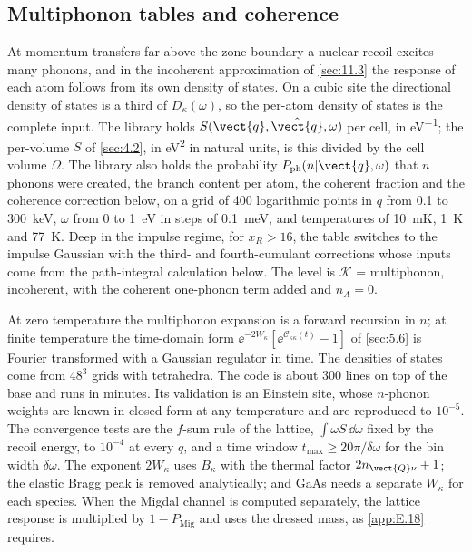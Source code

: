\subsection{Multiphonon tables and coherence}

At momentum transfers far above the zone boundary a nuclear recoil excites many phonons, and in the incoherent approximation of \cref{sec:11.3} the response of each atom follows from its own density of states. On a cubic site the directional density of states is a third of $D_\kappa(\omega)$, so the per-atom density of states is the complete input. The library holds $S(\vect{q},\hat{\vect{q}},\omega)$ per cell, in \si{eV^{-1}}; the per-volume $S$ of \cref{sec:4.2}, in \si{eV^2} in natural units, is this divided by the cell volume $\Omega$. The library also holds the probability $P_{\mathrm{ph}}(n|\vect{q},\omega)$ that $n$ phonons were created, the branch content per atom, the coherent fraction and the coherence correction below, on a grid of 400 logarithmic points in $q$ from 0.1 to \SI{300}{keV}, $\omega$ from 0 to \SI{1}{eV} in steps of \SI{0.1}{meV}, and temperatures of \SI{10}{mK}, \SI{1}{K} and \SI{77}{K}. Deep in the impulse regime, for $x_R > 16$, the table switches to the impulse Gaussian with the third- and fourth-cumulant corrections whose inputs come from the path-integral calculation below. The level is $\mathcal{K}$ = multiphonon, incoherent, with the coherent one-phonon term added and $n_A = 0$.

At zero temperature the multiphonon expansion is a forward recursion in $n$; at finite temperature the time-domain form $\ee^{-2W_\kappa}[\ee^{\mathcal{C}_{\kappa\kappa}(t)} - 1]$ of \cref{sec:5.6} is Fourier transformed with a Gaussian regulator in time. The densities of states come from $48^3$ grids with tetrahedra. The code is about 300 lines on top of the base and runs in minutes. Its validation is an Einstein site, whose $n$-phonon weights are known in closed form at any temperature and are reproduced to $10^{-5}$. The convergence tests are the $f$-sum rule of the lattice, $\int\omega S\,\dd\omega$ fixed by the recoil energy, to $10^{-4}$ at every $q$, and a time window $t_{\mathrm{max}} \ge 20\pi/\delta\omega$ for the bin width $\delta\omega$. The exponent $2W_\kappa$ uses $B_\kappa$ with the thermal factor $2n_{\vect{Q}\nu} + 1$; the elastic Bragg peak is removed analytically; and GaAs needs a separate $W_\kappa$ for each species. When the Migdal channel is computed separately, the lattice response is multiplied by $1 - P_{\mathrm{Mig}}$ and uses the dressed mass, as \cref{app:E.18} requires.

